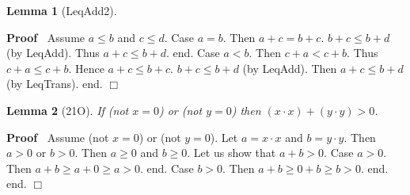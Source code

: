 \documentclass{article}
\newenvironment{forthel}{\begin{leftbar}}{\end{leftbar}}
\newenvironment{proof}{\noindent\textbf{Proof\ }}{\hspace*{\fill}$\Box$\medskip}
\newtheorem{lemma}{Lemma}
\begin{document}
\begin{forthel}
\begin{lemma}[LeqAdd2]
\end{lemma}
\begin{proof}
Assume $a  \leq  b$ and $c  \leq  d$. \newline
Case $a=b$. Then $a+c = b+c$. $b+c  \leq  b+d$ (by LeqAdd). Thus $a+c  \leq  b+d$. end.\newline
Case $a  <  b$. Then $c+a  <  c+b$. Thus $c+a  \leq  c+b$. Hence $a+c  \leq  b+c$. $b+c  \leq  b+d$ (by LeqAdd).\newline
Then $a+c  \leq  b+d$ (by LeqTrans). end.
\end{proof}



\begin{lemma}[21O] If (not $x = 0$) or (not $y = 0$) then $(x \cdot x) + (y \cdot y) > 0$.

\end{lemma}
\begin{proof}
Assume (not $x=0$) or (not $y=0$).\newline
Let $a = x \cdot x$ and $b = y \cdot y$.\newline
Then $a >  0$ or $b > 0$.\newline
Then $a \geq  0$ and $b \geq 0$.\newline
Let us show that $a + b  >  0$.\newline
Case $a > 0$. Then $a+b \geq a+0 \geq a > 0$. end.\newline
Case $b > 0$. Then $a+b \geq 0+b \geq b > 0$. end.\newline
end.
\end{proof}



\end{forthel}
\end{document}
